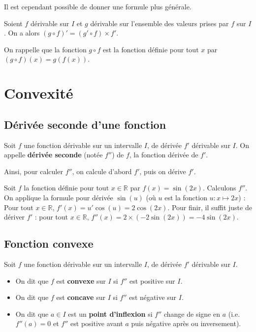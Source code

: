 	Il est cependant possible de donner une formule plus générale.

	\begin{formula}
		Soient $f$ dérivable sur $I$ et $g$ dérivable sur l'ensemble des valeurs prises par $f$ sur $I$. On a alors $(g \circ f)' = (g' \circ f) \times f'$.
	\end{formula}

	\begin{tip}
		On rappelle que la fonction $g \circ f$ est la fonction définie pour tout $x$ par $(g \circ f)(x) = g(f(x))$.
	\end{tip}

	\section{Convexité}

	\subsection{Dérivée seconde d'une fonction}

	\begin{formula}[Définition]
		Soit $f$ une fonction dérivable sur un intervalle $I$, de dérivée $f'$ dérivable sur $I$.
		\newpar
		On appelle \textbf{dérivée seconde} (notée $f''$) de $f$, la fonction dérivée de $f'$.
	\end{formula}

	Ainsi, pour calculer $f''$, on calcule d'abord $f'$, puis on dérive $f'$.

	\begin{tip}[Exemple]
		Soit $f$ la fonction définie pour tout $x \in \mathbb{R}$ par $f(x) = \sin(2x)$. Calculons $f''$.
		\newpar
		On applique la formule pour dérivée $\sin(u)$ (où $u$ est la fonction $u : x \mapsto 2x$) :
		\newpar
		Pour tout $x \in \mathbb{R}$, $f'(x) = u' \cos(u) = 2 \cos(2x)$.
		\newpar
		Pour finir, il suffit juste de dériver $f'$ : pour tout $x \in \mathbb{R}$, $f''(x) = 2 \times (-2 \sin(2x)) = -4 \sin(2x)$.
	\end{tip}

	\subsection{Fonction convexe}

	\begin{formula}[Définition]
		Soit $f$ une fonction dérivable sur un intervalle $I$, de dérivée $f'$ dérivable sur $I$.
		\begin{itemize}
			\item On dit que $f$ est \textbf{convexe} sur $I$ si $f''$ est positive sur $I$.
			\item On dit que $f$ est \textbf{concave} sur $I$ si $f''$ est négative sur $I$.
			\item On dit que $a \in I$ est un \textbf{point d'inflexion} si $f''$ change de signe en $a$ (i.e. $f''(a) = 0$ et $f''$ est positive avant $a$ puis négative après ou inversement).
		\end{itemize}
	\end{formula}

